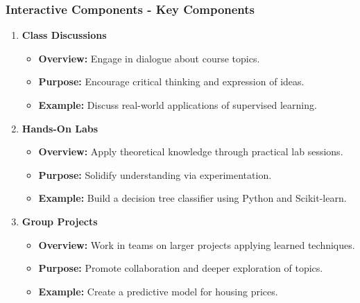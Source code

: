 \documentclass[aspectratio=169]{beamer}
\begin{document}
\begin{frame}[fragile]
  \frametitle{Interactive Components - Key Components}
  \begin{enumerate}
    \item \textbf{Class Discussions}
      \begin{itemize}
        \item \textbf{Overview:} Engage in dialogue about course topics.
        \item \textbf{Purpose:} Encourage critical thinking and expression of ideas.
        \item \textbf{Example:} Discuss real-world applications of supervised learning.
      \end{itemize}
      
    \item \textbf{Hands-On Labs}
      \begin{itemize}
        \item \textbf{Overview:} Apply theoretical knowledge through practical lab sessions.
        \item \textbf{Purpose:} Solidify understanding via experimentation.
        \item \textbf{Example:} Build a decision tree classifier using Python and Scikit-learn.
      \end{itemize}

    \item \textbf{Group Projects}
      \begin{itemize}
        \item \textbf{Overview:} Work in teams on larger projects applying learned techniques.
        \item \textbf{Purpose:} Promote collaboration and deeper exploration of topics.
        \item \textbf{Example:} Create a predictive model for housing prices.
      \end{itemize}
  \end{enumerate}
\end{frame}
\end{document}
